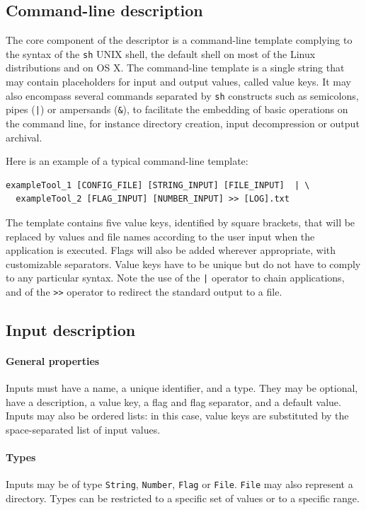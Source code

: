 \documentclass[a4paper,num-refs]{oup-contemporary}
\begin{document}
\subsection{Command-line description}

The core component of the descriptor is a command-line template
complying to the syntax of the \texttt{sh} UNIX shell, the default
shell on most of the Linux distributions and on OS X. The command-line
template is a single string that may contain placeholders for input and output values, called
value keys. It may also encompass several commands separated by
\texttt{sh} constructs such as semicolons, pipes (\texttt{|}) or
ampersands (\texttt{\&}), to facilitate the embedding of basic
operations on the command line, for instance directory creation, input
decompression or output archival.

Here is an example of a typical command-line template:
\begin{verbatim}
exampleTool_1 [CONFIG_FILE] [STRING_INPUT] [FILE_INPUT]  | \
  exampleTool_2 [FLAG_INPUT] [NUMBER_INPUT] >> [LOG].txt
\end{verbatim}
The template contains five value keys, identified by square brackets,
that will be replaced by values and file names according to the user
input when the application is executed. Flags will also be added
wherever appropriate, with customizable separators. Value keys have to
be unique but do not have to comply to any particular syntax. Note the
use of the \texttt{|} operator to chain applications, and of
the \texttt{>>} operator to redirect the standard output to a file.

\subsection{Input description}

\paragraph{General properties} Inputs must have a name, a unique
identifier, and a type. They may be optional, have a description, a
value key, a flag and flag separator, and a default value. Inputs may
also be ordered lists: in this case, value keys are substituted by the
space-separated list of input values.

\paragraph{Types} Inputs may be of type \texttt{String}, \texttt{Number},
\texttt{Flag} or \texttt{File}. \texttt{File} may also represent a directory.
Types can be restricted to a specific set of values or to a specific range.
\end{document}
